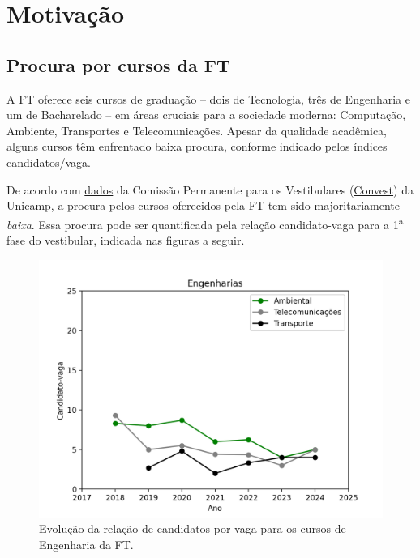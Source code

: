 \documentclass[
  letterpaper,
  DIV=11,
  numbers=noendperiod]{scrreprt}
\begin{document}

\chapter{Motivação}\label{motivauxe7uxe3o}

\section{Procura por cursos da FT}\label{procura-por-cursos-da-ft}

A FT oferece seis cursos de graduação -- dois de Tecnologia, três de
Engenharia e um de Bacharelado -- em áreas cruciais para a sociedade
moderna: Computação, Ambiente, Transportes e Telecomunicações. Apesar da
qualidade acadêmica, alguns cursos têm enfrentado baixa procura,
conforme indicado pelos índices candidatos/vaga.

De acordo com
\href{https://www.comvest.unicamp.br/base-de-dados-comvest/vestibulares/vestibulares-anteriores/}{dados}
da Comissão Permanente para os Vestibulares
(\href{https://www.comvest.unicamp.br/}{Convest}) da Unicamp, a procura
pelos cursos oferecidos pela FT tem sido majoritariamente \emph{baixa}.
Essa procura pode ser quantificada pela relação candidato-vaga para a
1\textsuperscript{a} fase do vestibular, indicada nas figuras a seguir.

\begin{figure}[H]

{\centering \includegraphics[width=0.6\linewidth,height=\textheight,keepaspectratio]{motivacao/../dados/grafico-candidato-vaga-engenharias.png}

}

\caption{Evolução da relação de candidatos por vaga para os cursos de
Engenharia da FT.}

\end{figure}%
\end{document}
